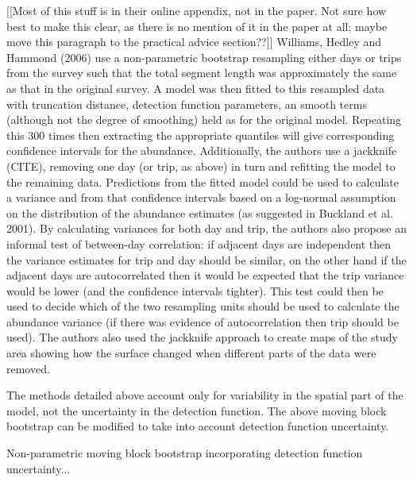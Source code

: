 \documentclass[useAMS,referee]{biom}
\begin{document}
[[Most of this stuff is in their online appendix, not in the paper. Not sure how best to make this clear, as there is no mention of it in the paper at all; maybe move this paragraph to the practical advice section??]] 
Williams, Hedley and Hammond (2006) use a non-parametric bootstrap resampling either days or trips from the survey such that the total segment length was approximately the same as that in the original survey. A model was then fitted to this resampled data with truncation distance, detection function parameters, an smooth terms (although not the degree of smoothing) held as for the original model. Repeating this 300 times then extracting the appropriate quantiles will give corresponding confidence intervals for the abundance. Additionally, the authors use a jackknife (CITE), removing one day (or trip, as above) in turn and refitting the model to the remaining data. Predictions from the fitted model could be used to calculate a variance and from that confidence intervals based on a log-normal assumption on the distribution of the abundance estimates (as suggested in Buckland et al. 2001). By calculating variances for both day and trip, the authors also propose an informal test of between-day correlation: if adjacent days are independent then the variance estimates for trip and day should be similar, on the other hand if the adjacent days are autocorrelated then it would be expected that the trip variance would be lower (and the confidence intervals tighter). This test could then be used to decide which of the two resampling units should be used to calculate the abundance variance (if there was evidence of autocorrelation then trip should be used). The authors also used the jackknife approach to create maps of the study area showing how the surface changed when different parts of the data were removed.

The methods detailed above account only for variability in the spatial part of the model, not the uncertainty in the detection function. The above moving block bootstrap can be modified to take into account detection function uncertainty.




Non-parametric moving block bootstrap incorporating detection function uncertainty...
\end{document}
